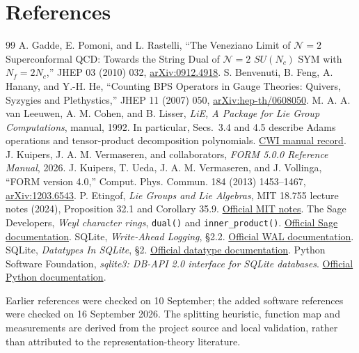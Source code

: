 \documentclass[11pt,a4paper]{article}
\newcommand{\code}[1]{{\small\nolinkurl{#1}}}
\begin{document}
\clearpage
\section*{References}\label{sec:refs}
\begingroup\renewcommand{\section}[2]{}\begin{thebibliography}{99}
 A. Gadde, E. Pomoni, and L. Rastelli, ``The Veneziano Limit of
$\mathcal N=2$ Superconformal QCD: Towards the String Dual of $\mathcal N=2$
$SU(N_c)$ SYM with $N_f=2N_c$,'' JHEP 03 (2010) 032,
\href{https://arxiv.org/abs/0912.4918}{arXiv:0912.4918}.
 S. Benvenuti, B. Feng, A. Hanany, and Y.-H. He,
``Counting BPS Operators in Gauge Theories: Quivers, Syzygies and Plethystics,''
JHEP 11 (2007) 050, \href{https://arxiv.org/abs/hep-th/0608050}{arXiv:hep-th/0608050}.
 M. A. A. van Leeuwen, A. M. Cohen, and B. Lisser,
\emph{LiE, A Package for Lie Group Computations}, manual, 1992. In particular,
Secs.~3.4 and 4.5 describe Adams operations and tensor-product decomposition
polynomials. \href{https://ir.cwi.nl/pub/29817}{CWI manual record}.
 J. Kuipers, J. A. M. Vermaseren, and collaborators,
\emph{FORM 5.0.0 Reference Manual}, 2026.
 J. Kuipers, T. Ueda, J. A. M. Vermaseren, and J. Vollinga,
``FORM version 4.0,'' Comput. Phys. Commun. 184 (2013) 1453--1467,
\href{https://arxiv.org/abs/1203.6543}{arXiv:1203.6543}.
 P. Etingof, \emph{Lie Groups and Lie Algebras}, MIT 18.755
lecture notes (2024), Proposition 32.1 and Corollary 35.9.
\href{https://ocw.mit.edu/courses/18-755-lie-groups-and-lie-algebras-ii-spring-2024/mit18_755_s24_lec_full.pdf}{Official MIT notes}.
 The Sage Developers, \emph{Weyl character rings},
\code{dual()} and \code{inner_product()}.
\href{https://doc.sagemath.org/html/en/reference/combinat/sage/combinat/root_system/weyl_characters.html}{Official Sage documentation}.
 SQLite, \emph{Write-Ahead Logging}, \S2.2.
\href{https://www.sqlite.org/wal.html}{Official WAL documentation}.
 SQLite, \emph{Datatypes In SQLite}, \S2.
\href{https://www.sqlite.org/datatype3.html}{Official datatype documentation}.
 Python Software Foundation, \emph{sqlite3: DB-API 2.0
interface for SQLite databases}.
\href{https://docs.python.org/3/library/sqlite3.html}{Official Python documentation}.

\end{thebibliography}\endgroup
Earlier references were checked on 10 September; the added software references
were checked on 16 September 2026. The splitting heuristic,
function map and measurements are derived from the project source and local
validation, rather than attributed to the representation-theory literature.
\end{document}
